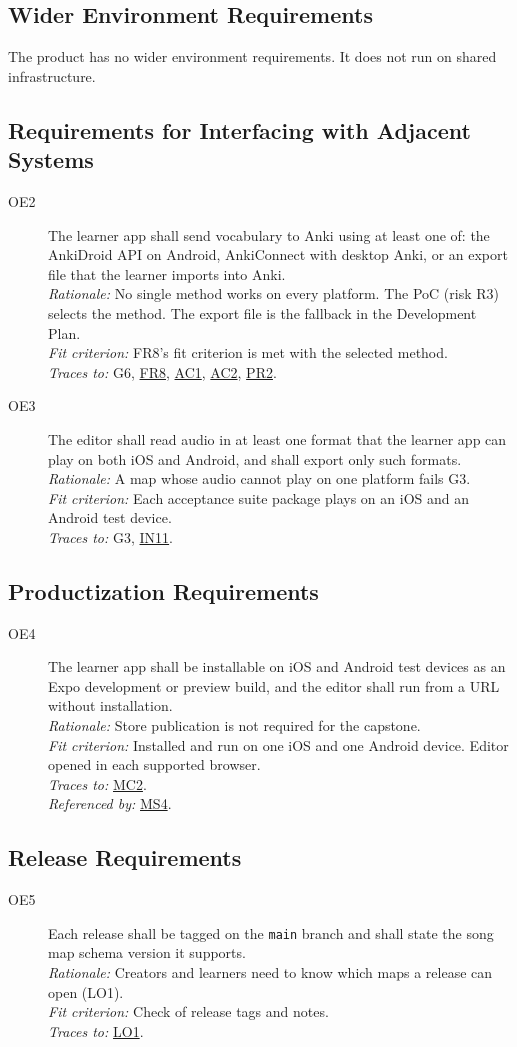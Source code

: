 \documentclass[12pt]{article}
\newcommand{\rat}[1]{\\\textit{Rationale:} #1}
\newcommand{\fit}[1]{\\\textit{Fit criterion:} #1}
\newcommand{\trace}[1]{\\\textit{Traces to:} #1}
\newcommand{\usedby}[1]{\\\textit{Referenced by:} #1}
\newcommand{\reqdef}[1]{\hypertarget{req:#1}{#1}}
\newcommand{\req}[1]{\hyperlink{req:#1}{#1}}
\begin{document}
\subsection{Wider Environment Requirements}
The product has no wider environment requirements. It does not run on shared
infrastructure.

\subsection{Requirements for Interfacing with Adjacent Systems} \label{SecAdjacent}
\begin{description}
\item[\reqdef{OE2}] The learner app shall send vocabulary to Anki using at least one
of: the AnkiDroid API on Android, AnkiConnect with desktop Anki, or an export
file that the learner imports into Anki.
\rat{No single method works on every platform. The PoC (risk R3) selects the
method. The export file is the fallback in the Development Plan.}
\fit{FR8's fit criterion is met with the selected method.}
\trace{G6, \req{FR8}, \req{AC1}, \req{AC2}, \req{PR2}.}

\item[\reqdef{OE3}] The editor shall read audio in at least one format that the learner
app can play on both iOS and Android, and shall export only such formats.
\rat{A map whose audio cannot play on one platform fails G3.}
\fit{Each acceptance suite package plays on an iOS and an Android test device.}
\trace{G3, \req{IN11}.}
\end{description}

\subsection{Productization Requirements}
\begin{description}
\item[\reqdef{OE4}] The learner app shall be installable on iOS and Android test
devices as an Expo development or preview build, and the editor shall run from
a URL without installation.
\rat{Store publication is not required for the capstone.}
\fit{Installed and run on one iOS and one Android device. Editor opened in each
supported browser.}
\trace{\req{MC2}.}
\usedby{\req{MS4}.}
\end{description}

\subsection{Release Requirements}
\begin{description}
\item[\reqdef{OE5}] Each release shall be tagged on the \texttt{main} branch and shall
state the song map schema version it supports.
\rat{Creators and learners need to know which maps a release can open
(LO1).}
\fit{Check of release tags and notes.}
\trace{\req{LO1}.}
\end{description}
\end{document}
